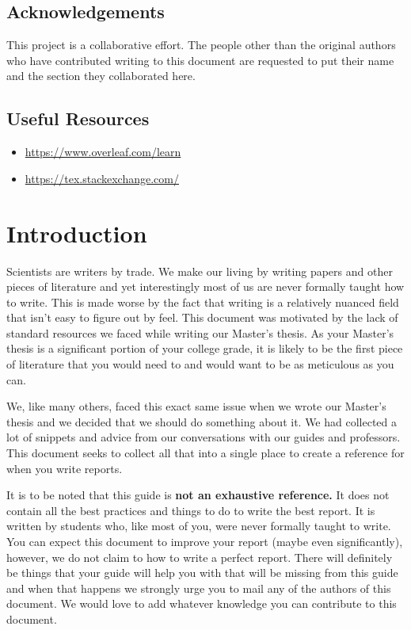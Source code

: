 \documentclass[english,10pt,a4paper, openany, oneside]{book}
\begin{document}
{		\section*{Acknowledgements}
        This project is a collaborative effort. The people other than the original authors who have contributed writing to this document are requested to put their name and the section they collaborated here.
		
		\section*{Useful Resources}
		\begin{itemize}
			\item \url{https://www.overleaf.com/learn}
			\item \url{https://tex.stackexchange.com/}
		\end{itemize}
		\tableofcontents
	}
	
	\mainmatter
	\chapter{Introduction}	
	
	
	
	Scientists are writers by trade. We make our living by writing papers and other pieces of literature and yet interestingly most of us are never formally taught how to write. This is made worse by the fact that writing is a relatively nuanced field that isn't easy to figure out by feel. This document was motivated by the lack of standard resources we faced while writing our Master's thesis. As your Master's thesis is a significant portion of your college grade, it is likely to be the first piece of literature that you would need to and would want to be as meticulous as you can. 
	
	We, like many others, faced this exact same issue when we wrote our Master's thesis and we decided that we should do something about it. We had collected a lot of snippets and advice from our conversations with our guides and professors. This document seeks to collect all that into a single place to create a reference for when you write reports.
	
	It is to be noted that this guide is \textbf{not an exhaustive reference.} It does not contain all the best practices and things to do to write the best report. It is written by students who, like most of you, were never formally taught to write. You can expect this document to improve your report (maybe even significantly), however, we do not claim to how to write a perfect report. There will definitely be things that your guide will help you with that will be missing from this guide and when that happens we strongly urge you to mail any of the authors of this document. We would love to add whatever knowledge you can contribute to this document.
	
\end{document}
